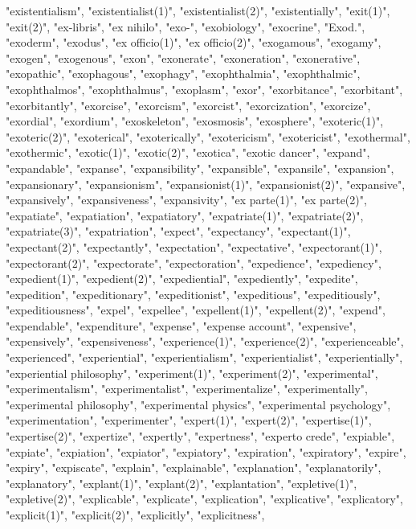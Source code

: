 "existentialism",
"existentialist(1)",
"existentialist(2)",
"existentially",
"exit(1)",
"exit(2)",
"ex-libris",
"ex nihilo",
"exo-",
"exobiology",
"exocrine",
"Exod.",
"exoderm",
"exodus",
"ex officio(1)",
"ex officio(2)",
"exogamous",
"exogamy",
"exogen",
"exogenous",
"exon",
"exonerate",
"exoneration",
"exonerative",
"exopathic",
"exophagous",
"exophagy",
"exophthalmia",
"exophthalmic",
"exophthalmos",
"exophthalmus",
"exoplasm",
"exor",
"exorbitance",
"exorbitant",
"exorbitantly",
"exorcise",
"exorcism",
"exorcist",
"exorcization",
"exorcize",
"exordial",
"exordium",
"exoskeleton",
"exosmosis",
"exosphere",
"exoteric(1)",
"exoteric(2)",
"exoterical",
"exoterically",
"exotericism",
"exotericist",
"exothermal",
"exothermic",
"exotic(1)",
"exotic(2)",
"exotica",
"exotic dancer",
"expand",
"expandable",
"expanse",
"expansibility",
"expansible",
"expansile",
"expansion",
"expansionary",
"expansionism",
"expansionist(1)",
"expansionist(2)",
"expansive",
"expansively",
"expansiveness",
"expansivity",
"ex parte(1)",
"ex parte(2)",
"expatiate",
"expatiation",
"expatiatory",
"expatriate(1)",
"expatriate(2)",
"expatriate(3)",
"expatriation",
"expect",
"expectancy",
"expectant(1)",
"expectant(2)",
"expectantly",
"expectation",
"expectative",
"expectorant(1)",
"expectorant(2)",
"expectorate",
"expectoration",
"expedience",
"expediency",
"expedient(1)",
"expedient(2)",
"expediential",
"expediently",
"expedite",
"expedition",
"expeditionary",
"expeditionist",
"expeditious",
"expeditiously",
"expeditiousness",
"expel",
"expellee",
"expellent(1)",
"expellent(2)",
"expend",
"expendable",
"expenditure",
"expense",
"expense account",
"expensive",
"expensively",
"expensiveness",
"experience(1)",
"experience(2)",
"experienceable",
"experienced",
"experiential",
"experientialism",
"experientialist",
"experientially",
"experiential philosophy",
"experiment(1)",
"experiment(2)",
"experimental",
"experimentalism",
"experimentalist",
"experimentalize",
"experimentally",
"experimental philosophy",
"experimental physics",
"experimental psychology",
"experimentation",
"experimenter",
"expert(1)",
"expert(2)",
"expertise(1)",
"expertise(2)",
"expertize",
"expertly",
"expertness",
"experto crede",
"expiable",
"expiate",
"expiation",
"expiator",
"expiatory",
"expiration",
"expiratory",
"expire",
"expiry",
"expiscate",
"explain",
"explainable",
"explanation",
"explanatorily",
"explanatory",
"explant(1)",
"explant(2)",
"explantation",
"expletive(1)",
"expletive(2)",
"explicable",
"explicate",
"explication",
"explicative",
"explicatory",
"explicit(1)",
"explicit(2)",
"explicitly",
"explicitness",
